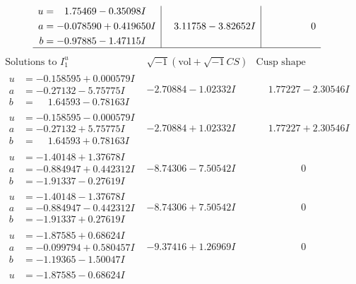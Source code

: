 \documentclass[1p]{elsarticle_modified}
\theoremstyle{definition}
\newcommand{\I}{\sqrt{-1}}
\begin{document}
$$\begin{array}{c|c|c}
\begin{aligned}
u &= \phantom{-}1.75469 - 0.35098 I \\
a &= -0.078590 + 0.419650 I \\
b &= -0.97885 - 1.47115 I\end{aligned}
 & \phantom{-}3.11758 - 3.82652 I & \phantom{-0.000000 } 0\\
 \hline 
 \end{array}$$\newpage$$\begin{array}{c|c|c}  
\text{Solutions to }I^u_{1}& \I (\text{vol} + \sqrt{-1}CS) & \text{Cusp shape}\\
 \hline 
\begin{aligned}
u &= -0.158595 + 0.000579 I \\
a &= -0.27132 - 5.75775 I \\
b &= \phantom{-}1.64593 - 0.78163 I\end{aligned}
 & -2.70884 - 1.02332 I & \phantom{-}1.77227 - 2.30546 I \\ \hline\begin{aligned}
u &= -0.158595 - 0.000579 I \\
a &= -0.27132 + 5.75775 I \\
b &= \phantom{-}1.64593 + 0.78163 I\end{aligned}
 & -2.70884 + 1.02332 I & \phantom{-}1.77227 + 2.30546 I \\ \hline\begin{aligned}
u &= -1.40148 + 1.37678 I \\
a &= -0.884947 + 0.442312 I \\
b &= -1.91337 - 0.27619 I\end{aligned}
 & -8.74306 - 7.50542 I & \phantom{-0.000000 } 0 \\ \hline\begin{aligned}
u &= -1.40148 - 1.37678 I \\
a &= -0.884947 - 0.442312 I \\
b &= -1.91337 + 0.27619 I\end{aligned}
 & -8.74306 + 7.50542 I & \phantom{-0.000000 } 0 \\ \hline\begin{aligned}
u &= -1.87585 + 0.68624 I \\
a &= -0.099794 + 0.580457 I \\
b &= -1.19365 - 1.50047 I\end{aligned}
 & -9.37416 + 1.26969 I & \phantom{-0.000000 } 0 \\ \hline\begin{aligned}
u &= -1.87585 - 0.68624 I \\

\end{aligned}
\end{array}$$
\end{document}
